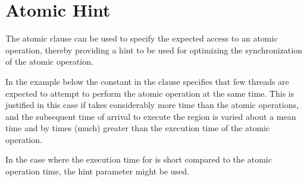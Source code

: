 \section{Atomic Hint}
\label{sec:atomic_hint}

The atomic  clause can be used to specify the
expected access to an atomic operation, thereby providing a hint
to be used for optimizing the synchronization of the atomic operation.

In the example below the  constant
in the  clause specifies that few threads are expected
to attempt to perform the atomic operation at the same time.
This is justified in this case if  takes considerably
more time than the atomic operations, and the subsequent time of
arrival to execute the  region is varied about a mean time
and by times (much) greater than the execution time of the atomic
operation.

In the case where the execution time for  is short
compared to the atomic operation time, the 
hint parameter might be used. 




